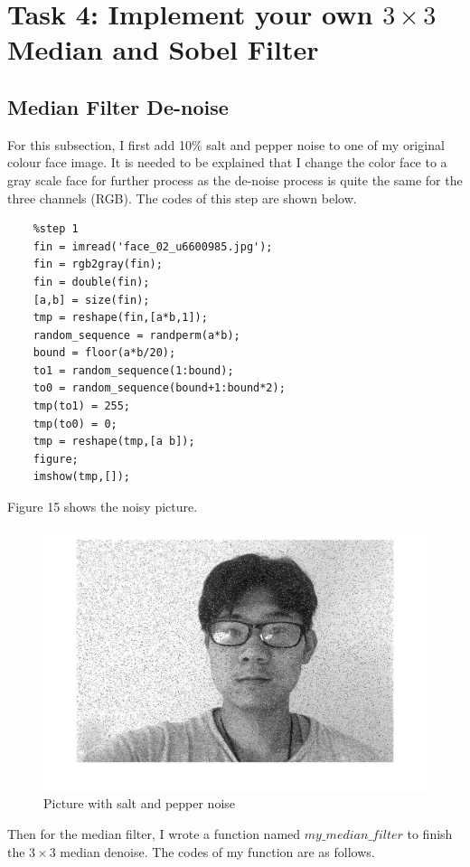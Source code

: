 \documentclass{article}
\begin{document}
\section{Task 4: Implement your own $3\times3$ Median and Sobel Filter}
\subsection{Median Filter De-noise}
 
For this subsection, I first add 10\% salt and pepper noise to one of my original colour face image. It is needed to be explained that I change the color face to a gray scale face for further process as the de-noise process is quite the same for the three channels (RGB). The codes of this step are shown below. 
\begin{lstlisting}
    %step 1
    fin = imread('face_02_u6600985.jpg');
    fin = rgb2gray(fin);
    fin = double(fin);
    [a,b] = size(fin);
    tmp = reshape(fin,[a*b,1]);
    random_sequence = randperm(a*b);
    bound = floor(a*b/20);
    to1 = random_sequence(1:bound);
    to0 = random_sequence(bound+1:bound*2);
    tmp(to1) = 255;
    tmp(to0) = 0;
    tmp = reshape(tmp,[a b]);
    figure;
    imshow(tmp,[]);
\end{lstlisting}

Figure 15 shows the noisy picture.

\begin{figure}[htbp]
    \centering
    \includegraphics[scale = 0.25]{fig12.jpg}
    \caption{Picture with salt and pepper noise}
    \label{fig12}
\end{figure}

Then for the median filter, I wrote a function named $my\_median\_filter$ to finish the $3\times3$ median denoise. The codes of my function are as follows.
\end{document}
